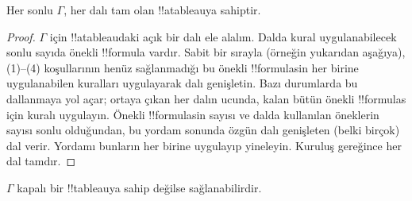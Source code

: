 \begin{prop}
  Her sonlu $\Gamma$, her dalı tam olan !!a{tableau}{}ya sahiptir.
\end{prop}

\begin{proof}
  $\Gamma$ için !!a{tableau}{}daki açık bir dalı ele alalım. Dalda kural
  uygulanabilecek sonlu sayıda önekli !!{formula} vardır. Sabit bir sırayla
  (örneğin yukarıdan aşağıya), (1)--(4) koşullarının henüz sağlanmadığı bu
  önekli !!{formula}s{}in her birine uygulanabilen kuralları uygulayarak dalı
  genişletin. Bazı durumlarda bu dallanmaya yol açar; ortaya çıkan her dalın
  ucunda, kalan bütün önekli !!{formula}s için kuralı uygulayın. Önekli
  !!{formula}s{}in sayısı ve dalda kullanılan öneklerin sayısı sonlu olduğundan,
  bu yordam sonunda özgün dalı genişleten (belki birçok) dal verir. Yordamı
  bunların her birine uygulayıp yineleyin. Kuruluş gereğince her dal tamdır.
\end{proof}

\begin{thm}[Tamlık]
  $\Gamma$ kapalı bir !!{tableau}{}ya sahip değilse sağlanabilirdir.
\end{thm}

